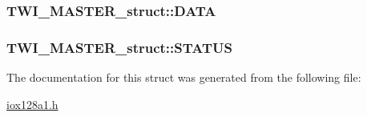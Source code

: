 \label{struct_t_w_i___m_a_s_t_e_r__struct_a8294d4047384a14284395f25c4c8e1fa}
\hypertarget{struct_t_w_i___m_a_s_t_e_r__struct_ad8a09a564ae6ff6ad6038dd1b6b29131}{
\subsubsection[{DATA}]{ {\bf TWI\_\-MASTER\_\-struct::DATA}}}
\label{struct_t_w_i___m_a_s_t_e_r__struct_ad8a09a564ae6ff6ad6038dd1b6b29131}
\hypertarget{struct_t_w_i___m_a_s_t_e_r__struct_aea15764b94901a2cd5664d75abdf1388}{
\subsubsection[{STATUS}]{ {\bf TWI\_\-MASTER\_\-struct::STATUS}}}
\label{struct_t_w_i___m_a_s_t_e_r__struct_aea15764b94901a2cd5664d75abdf1388}


The documentation for this struct was generated from the following file:\begin{DoxyCompactItemize}
\item 
\hyperlink{iox128a1_8h}{iox128a1.h}\end{DoxyCompactItemize}
